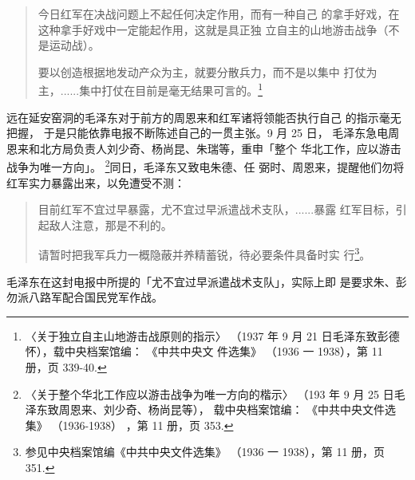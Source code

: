\begin{quote}
	\fzwkai 今日红军在决战问题上不起任何决定作用，而有一种自己
的拿手好戏，在这种拿手好戏中一定能起作用，这就是具正独
立自主的山地游击战争（不是运动战）。

要以创造根据地发动产众为主，就要分散兵力，而不是以集中
打仗为主，......集中打仗在目前是毫无结果可言的。\footnote{〈关于独立自主山地游击战原则的指示〉
（1937 年 9 月 21 日毛泽东致彭德怀），载中央档案馆编：
《中共中央文 件选集》
（1936 一 1938），第 11 册，页 339-40.} 
\end{quote}

远在延安窑洞的毛泽东对于前方的周恩来和红军诸将领能否执行自己
的指示毫无把握，
于是只能依靠电报不断陈述自己的一贯主张。9 月 25 日，
毛泽东急电周恩来和北方局负责人刘少奇、杨尚昆、朱瑞等，重申「整个
华北工作，应以游击战争为唯一方向」。 \footnote{〈关于整个华北工作应以游击战争为唯一方向的楷示〉
（193 年 9 月 25 日毛泽东致周恩来、刘少奇、杨尚昆等），
载中央档案馆编：
《中共中央文件选集》
（1936-1938）
，第 11 册，页 353.}同日，毛泽东又致电朱德、任
弼时、周恩来，提醒他们勿将红军实力暴露出来，以免遭受不测：
\begin{quote}
	\fzwkai 目前红军不宜过早暴露，尤不宜过早派遣战术支队，......暴露
红军目标，引起敌人注意，那是不利的。

请暂时把我军兵力一概隐蔽并养精蓄锐，待必要条件具备时实
行\footnote{参见中央档案馆编《中共中央文件选集》
（1936 一 1938），第 11 册，页 351.}。
\end{quote}

 
毛泽东在这封电报中所提的「尤不宜过早派遣战术支队」，实际上即
是要求朱、彭勿派八路军配合国民党军作战。
 
